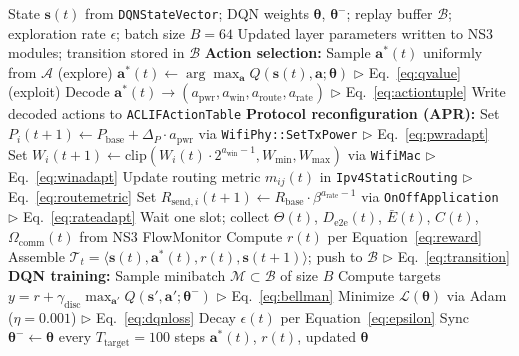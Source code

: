 \documentclass[a4paper]{cas-dc}
\numberwithin{equation}{section}
\begin{document}
\begin{algorithm}[!t]
\caption{RLJO-APR Optimize: Joint Optimization and Protocol Reconfiguration}
\label{alg:rljo_apr}
\begin{algorithmic}[1]\small
\Require State $\mathbf{s}(t)$ from \texttt{DQNStateVector};\; DQN weights $\boldsymbol{\theta}$, $\boldsymbol{\theta}^{-}$;\; replay buffer $\mathcal{B}$;\; exploration rate $\epsilon$;\; batch size $B=64$
\Ensure Updated layer parameters written to NS3 modules;\; transition stored in $\mathcal{B}$
\State \textbf{Action selection:}
    \State Sample $\mathbf{a}^*(t)$ uniformly from $\mathcal{A}$ \hfill (explore)
\Else
    \State $\mathbf{a}^*(t) \leftarrow \arg\max_{\mathbf{a}} Q(\mathbf{s}(t), \mathbf{a}; \boldsymbol{\theta})$ \hfill $\triangleright$ Eq.~\ref{eq:qvalue} (exploit)
\EndIf
\State Decode $\mathbf{a}^*(t) \rightarrow (a_{\text{pwr}}, a_{\text{win}}, a_{\text{route}}, a_{\text{rate}})$ \hfill $\triangleright$ Eq.~\ref{eq:actiontuple}
\State Write decoded actions to \texttt{ACLIFActionTable}
\State \textbf{Protocol reconfiguration (APR):}
    \State Set $P_i(t{+}1) \leftarrow P_{\text{base}} + \Delta_P \cdot a_{\text{pwr}}$ via \texttt{WifiPhy::SetTxPower} \hfill $\triangleright$ Eq.~\ref{eq:pwradapt}
    \State Set $W_i(t{+}1) \leftarrow \mathrm{clip}(W_i(t)\cdot 2^{a_{\text{win}}-1}, W_{\min}, W_{\max})$ via \texttt{WifiMac} \hfill $\triangleright$ Eq.~\ref{eq:winadapt}
    \State Update routing metric $m_{ij}(t)$ in \texttt{Ipv4StaticRouting} \hfill $\triangleright$ Eq.~\ref{eq:routemetric}
    \State Set $R_{\text{send},i}(t{+}1) \leftarrow R_{\text{base}}\cdot\beta^{a_{\text{rate}}-1}$ via \texttt{OnOffApplication} \hfill $\triangleright$ Eq.~\ref{eq:rateadapt}
\EndFor
\State Wait one slot; collect $\Theta(t)$, $D_{\text{e2e}}(t)$, $\bar{E}(t)$, $C(t)$, $\Omega_{\text{comm}}(t)$ from NS3 FlowMonitor
\State Compute $r(t)$ per Equation~\ref{eq:reward}
\State Assemble $\mathcal{T}_t = \langle \mathbf{s}(t), \mathbf{a}^*(t), r(t), \mathbf{s}(t{+}1) \rangle$; push to $\mathcal{B}$ \hfill $\triangleright$ Eq.~\ref{eq:transition}
\State \textbf{DQN training:}
    \State Sample minibatch $\mathcal{M} \subset \mathcal{B}$ of size $B$
    \State Compute targets $y = r + \gamma_{\text{disc}}\max_{\mathbf{a}'} Q(\mathbf{s}', \mathbf{a}'; \boldsymbol{\theta}^{-})$ \hfill $\triangleright$ Eq.~\ref{eq:bellman}
    \State Minimize $\mathcal{L}(\boldsymbol{\theta})$ via Adam ($\eta = 0.001$) \hfill $\triangleright$ Eq.~\ref{eq:dqnloss}
\EndIf
\State Decay $\epsilon(t)$ per Equation~\ref{eq:epsilon}
\State Sync $\boldsymbol{\theta}^- \leftarrow \boldsymbol{\theta}$ every $T_{\text{target}} = 100$ steps
\State \Return $\mathbf{a}^*(t)$, $r(t)$, updated $\boldsymbol{\theta}$
\end{algorithmic}
\end{algorithm}
\end{document}
